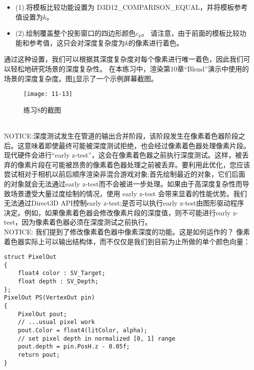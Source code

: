 \begin{itemize}
  \item (1).将模板比较功能设置为 D3D12\_COMPARISON\_EQUAL，并将模板参考值设置为$k$。
  \item (2).绘制覆盖整个投影窗口的四边形颜色$c_{k}$。 请注意，由于前面的模板比较功能和参考值，这只会对深度复杂度为$k$的像素进行着色。
\end{itemize}

\begin{flushleft}
通过这种设置，我们可以根据其深度复杂度对每个像素进行唯一着色，因此我们可以轻松地研究场景的深度复杂性。 在本练习中，渲染第10章“Blend”演示中使用的场景的深度复杂度。图\ref{fig:11-13}显示了一个示例屏幕截图。
\end{flushleft}

\begin{figure}[h]
    \texttt{[image: 11-13]}
    \centering
    \caption{练习8的截图}
    \label{fig:11-13}
\end{figure}

\begin{flushleft}
~\\
NOTICE:深度测试发生在管道的输出合并阶段，该阶段发生在像素着色器阶段之后。这意味着即使最终可能被深度测试拒绝，也会经过像素着色器处理像素片段。现代硬件会进行“early z-test”，这会在像素着色器之前执行深度测试。这样，被丢弃的像素片段在可能被昂贵的像素着色器处理之前被丢弃。要利用此优化，您应该尝试相对于相机以前后顺序渲染非混合游戏对象;首先绘制最近的对象，它们后面的对象就会无法通过early z-test而不会被进一步处理。如果由于高深度复杂性而导致场景遭受大量过度绘制的情况，使用 early z-test 会带来显着的性能优势。我们无法通过Direct3D API控制early z-test;是否可以执行early z-test由图形驱动程序决定。例如，如果像素着色器会修改像素片段的深度值，则不可能进行early z-test，因为像素着色器必须在深度测试之前执行。
~\\
NOTICE: 我们提到了修改像素着色器中像素深度的功能。这是如何运作的？ 像素着色器实际上可以输出结构体，而不仅仅是我们到目前为止所做的单个颜色向量：\\
\end{flushleft}

\begin{lstlisting}
struct PixelOut
{
    float4 color : SV_Target;
    float depth : SV_Depth;
};
PixelOut PS(VertexOut pin)
{
    PixelOut pout;
    // ...usual pixel work
    pout.Color = float4(litColor, alpha);
    // set pixel depth in normalized [0, 1] range
    pout.depth = pin.PosH.z - 0.05f;
    return pout;
}
\end{lstlisting}

